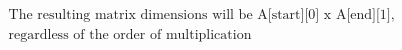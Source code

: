 \documentclass[preview]{standalone}
\begin{document}
\begin{center}
\begin{align*}
&\text{The resulting matrix dimensions will be A[start][0] x A[end][1],}\\
&\text{regardless of the order of multiplication}
\end{align*}
\end{center}
\end{document}
